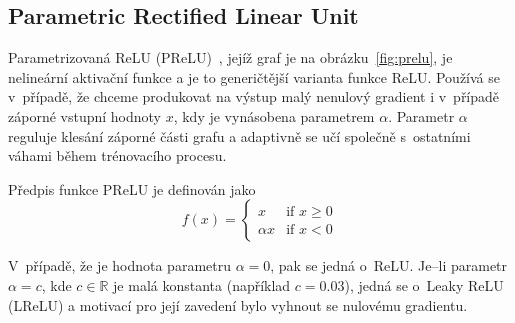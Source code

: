 


\subsection*{Parametric Rectified Linear Unit}
Parametrizovaná ReLU (PReLU)~\cite{he2015delving}, jejíž graf je na obrázku~\ref{fig:prelu}, je nelineární aktivační funkce a je to generičtější varianta funkce ReLU. Používá se v~případě, že chceme produkovat na výstup malý nenulový gradient i v~případě záporné vstupní hodnoty $x$, kdy je vynásobena parametrem $\alpha$. Parametr $\alpha$ reguluje klesání záporné části grafu a adaptivně se učí společně s~ostatními váhami během trénovacího procesu.

Předpis funkce PReLU je definován jako
\begin{equation}
  f(x) =
  \begin{cases}
    x & \text{if } x \geq 0 \\
    {\alpha}x & \text{if } x < 0
  \end{cases}
\end{equation}


V~případě, že je hodnota parametru $\alpha=0$, pak se jedná o~ReLU. Je--li parametr $\alpha = c$, kde $c\in\mathbb{R}$ je malá konstanta (například $c = 0.03$), jedná se o~Leaky ReLU (LReLU) a motivací pro její zavedení bylo vyhnout se nulovému gradientu.


